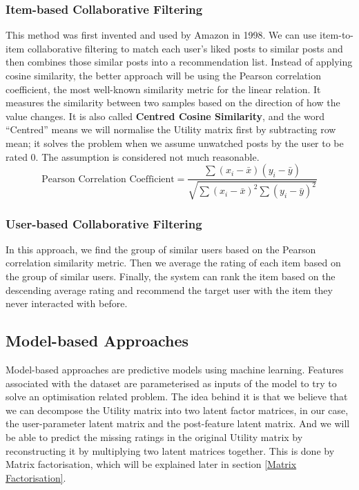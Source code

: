 \subsubsection{Item-based Collaborative Filtering}
This method was first invented and used by Amazon in 1998. We can use item-to-item collaborative filtering to match each user’s liked posts to similar posts and then combines those similar posts into a recommendation list.
Instead of applying cosine similarity, the better approach will be using the Pearson correlation coefficient, the most well-known similarity metric for the linear relation. It measures the similarity between two samples based on the direction of how the value changes. It is also called \textbf{Centred Cosine Similarity}, and the word “Centred” means we will normalise the Utility matrix first by subtracting row mean; it solves the problem when we assume unwatched posts by the user to be rated 0. The assumption is considered not much reasonable.
\begin{equation*}
\text{Pearson Correlation Coefficient} = \frac{\sum(x_{i} - \bar{x})(y_{i} - \bar{y})} {\sqrt{\sum(x_{i} - \bar{x})^{2} \sum{(y_{i} - \bar{y})^{2} }}}
\end{equation*}


\subsubsection{User-based Collaborative Filtering}
In this approach, we find the group of similar users based on the Pearson correlation similarity metric. Then we average the rating of each item based on the group of similar users. Finally, the system can rank the item based on the descending average rating and recommend the target user with the item they never interacted with before.

\subsection{Model-based Approaches}
Model-based approaches are predictive models using machine learning. Features associated with the dataset are parameterised as inputs of the model to try to solve an optimisation related problem. The idea behind it is that we believe that we can decompose the Utility matrix into two latent factor matrices, in our case, the user-parameter latent matrix and the post-feature latent matrix. And we will be able to predict the missing ratings in the original Utility matrix by reconstructing it by multiplying two latent matrices together. This is done by Matrix factorisation, which will be explained later in section \ref{Matrix Factorisation}.
